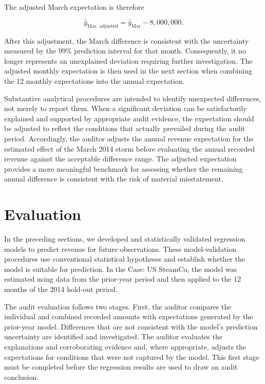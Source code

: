 The adjusted March expectation is therefore

\[
\hat{y}_{\text{Mar, adjusted}}
=
\hat{y}_{\text{Mar}} - 8,\!000,\!000.
\]

After this adjustment, the March difference is consistent with the uncertainty measured by the 99\% prediction interval for that month. Consequently, it no longer represents an unexplained deviation requiring further investigation. The adjusted monthly expectation is then used in the next section when combining the 12 monthly expectations into the annual expectation.

\medskip
Substantive analytical procedures are intended to identify unexpected differences, not merely to report them. When a significant deviation can be satisfactorily explained and supported by appropriate audit evidence, the expectation should be adjusted to reflect the conditions that actually prevailed during the audit period. Accordingly, the auditor adjusts the annual revenue expectation for the estimated effect of the March 2014 storm before evaluating the annual recorded revenue against the acceptable difference range. The adjusted expectation provides a more meaningful benchmark for assessing whether the remaining annual difference is consistent with the risk of material misstatement.


\section{Evaluation} %
\label{sec:auditor_response}

In the preceding sections, we developed and statistically validated regression models to predict revenue for future observations. These model-validation procedures use conventional statistical hypotheses and establish whether the model is suitable for prediction. In the Case: US SteamCo, the model was estimated using data from the prior-year period and then applied to the 12 months of the 2014 hold-out period.

The audit evaluation follows two stages. First, the auditor compares the individual and combined recorded amounts with expectations generated by the prior-year model. Differences that are not consistent with the model's prediction uncertainty are identified and investigated. The auditor evaluates the explanations and corroborating evidence and, where appropriate, adjusts the expectations for conditions that were not captured by the model. This first stage must be completed before the regression results are used to draw an audit conclusion.

